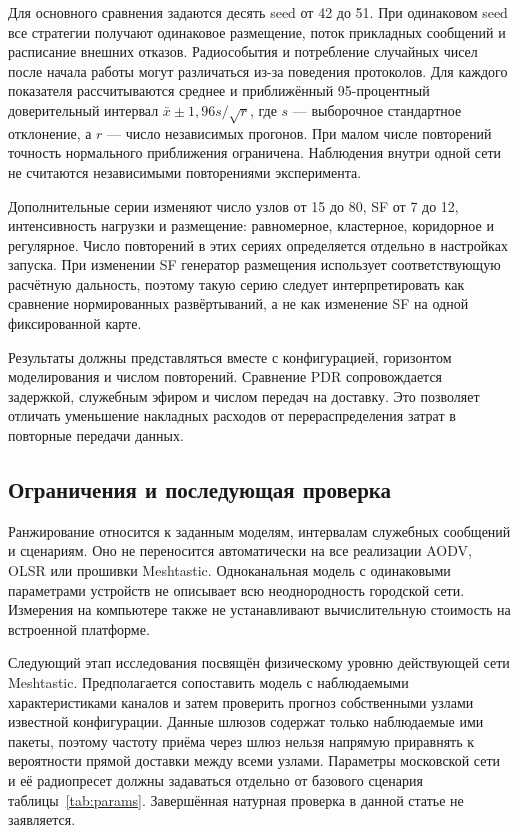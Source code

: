 Для основного сравнения задаются десять seed от 42 до 51. При одинаковом seed все стратегии получают одинаковое размещение, поток прикладных сообщений и расписание внешних отказов. Радиособытия и потребление случайных чисел после начала работы могут различаться из-за поведения протоколов. Для каждого показателя рассчитываются среднее и приближённый 95-процентный доверительный интервал $\bar{x}\pm1{,}96s/\sqrt{r}$, где $s$ --- выборочное стандартное отклонение, а $r$ --- число независимых прогонов. При малом числе повторений точность нормального приближения ограничена. Наблюдения внутри одной сети не считаются независимыми повторениями эксперимента.

Дополнительные серии изменяют число узлов от 15 до 80, SF от 7 до 12, интенсивность нагрузки и размещение: равномерное, кластерное, коридорное и регулярное. Число повторений в этих сериях определяется отдельно в настройках запуска. При изменении SF генератор размещения использует соответствующую расчётную дальность, поэтому такую серию следует интерпретировать как сравнение нормированных развёртываний, а не как изменение SF на одной фиксированной карте.

Результаты должны представляться вместе с конфигурацией, горизонтом моделирования и числом повторений. Сравнение PDR сопровождается задержкой, служебным эфиром и числом передач на доставку. Это позволяет отличать уменьшение накладных расходов от перераспределения затрат в повторные передачи данных.

\subsection{Ограничения и последующая проверка}

Ранжирование относится к заданным моделям, интервалам служебных сообщений и сценариям. Оно не переносится автоматически на все реализации AODV, OLSR или прошивки Meshtastic. Одноканальная модель с одинаковыми параметрами устройств не описывает всю неоднородность городской сети. Измерения на компьютере также не устанавливают вычислительную стоимость на встроенной платформе.

Следующий этап исследования посвящён физическому уровню действующей сети Meshtastic. Предполагается сопоставить модель с наблюдаемыми характеристиками каналов и затем проверить прогноз собственными узлами известной конфигурации. Данные шлюзов содержат только наблюдаемые ими пакеты, поэтому частоту приёма через шлюз нельзя напрямую приравнять к вероятности прямой доставки между всеми узлами. Параметры московской сети и её радиопресет должны задаваться отдельно от базового сценария таблицы~\ref{tab:params}. Завершённая натурная проверка в данной статье не заявляется.
